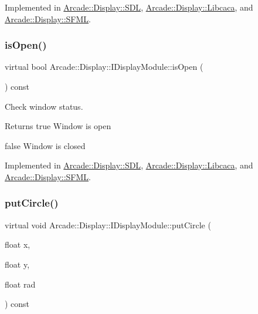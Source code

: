 Implemented in \mbox{\hyperlink{classArcade_1_1Display_1_1SDL_a14dd612e3902b1daa1d31cca71efcf00}{Arcade\+::\+Display\+::\+S\+DL}}, \mbox{\hyperlink{classArcade_1_1Display_1_1Libcaca_a8b7cc724a0aad2647938f80a167e0d33}{Arcade\+::\+Display\+::\+Libcaca}}, and \mbox{\hyperlink{classArcade_1_1Display_1_1SFML_a5695d2a080b43f958adf3a63acf5cf78}{Arcade\+::\+Display\+::\+S\+F\+ML}}.

\mbox{\label{classArcade_1_1Display_1_1IDisplayModule_a34c86dd2e7aa60a70c0cc06ccbd34e47}} 
\subsubsection{\texorpdfstring{isOpen()}{isOpen()}}
{\footnotesize\ttfamily virtual bool Arcade\+::\+Display\+::\+I\+Display\+Module\+::is\+Open (\begin{DoxyParamCaption}{ }\end{DoxyParamCaption}) const\hspace{0.3cm}{\ttfamily [pure virtual]}}



Check window status. 

\begin{DoxyReturn}{Returns}
true Window is open 

false Window is closed 
\end{DoxyReturn}


Implemented in \mbox{\hyperlink{classArcade_1_1Display_1_1SDL_a7d86c934d5dde9283e9c70816cf9c8a5}{Arcade\+::\+Display\+::\+S\+DL}}, \mbox{\hyperlink{classArcade_1_1Display_1_1Libcaca_aae9aa5b1c54a2086c4fa92e7710fc845}{Arcade\+::\+Display\+::\+Libcaca}}, and \mbox{\hyperlink{classArcade_1_1Display_1_1SFML_a77be7097a8ed969dcf1fca6f960d0c4c}{Arcade\+::\+Display\+::\+S\+F\+ML}}.

\mbox{\label{classArcade_1_1Display_1_1IDisplayModule_a68b7b140a378dc416ec278d97dc76e9e}} 
\subsubsection{\texorpdfstring{putCircle()}{putCircle()}}
{\footnotesize\ttfamily virtual void Arcade\+::\+Display\+::\+I\+Display\+Module\+::put\+Circle (\begin{DoxyParamCaption}\item[{float}]{x,  }\item[{float}]{y,  }\item[{float}]{rad }\end{DoxyParamCaption}) const\hspace{0.3cm}{\ttfamily [pure virtual]}}



